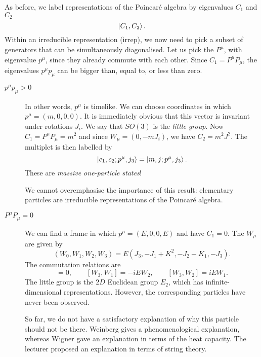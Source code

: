 As before, we label representations of the Poincaré algebra by eigenvalues $C_1$ and $C_2$
\begin{equation}
  \ket{C_1, C_2}.
\end{equation}
Within an irreducible representation (irrep), we now need to pick a subset of generators that can be simultaneously diagonalised. Let us pick the $P^{\mu}$, with eigenvalue $p^{\mu}$, since they already commute with each other.
Since $C_1 = P^{\mu} P_{\mu}$, the eigenvalues $p^{\mu} p_{\mu}$ can be bigger than, equal to, or less than zero.
\begin{description}
  \item[$p^{\mu} p_{\mu}> 0$] In other words, $p^{\mu}$ is timelike. We can choose coordinates in which $p^{\mu} = (m, 0,0,0)$.
    It is immediately obvious that this vector is invariant under rotations $J_i$. We say that $SO(3)$ is the \emph{little group}.
    Now $C_1 = P^{\mu} P_{\mu} = m^2$ and since $W_{\mu} = (0, -m J_i)$, we have $C_2 = m^2 J^2$.
    The multiplet is then labelled by
    \begin{equation}
      \ket{c_1, c_2; p^{\mu}, j_3} = \ket{m, j; p^{\mu}, j_3}.
    \end{equation}
    These are \emph{massive one-particle states}!
    \begin{remark}
      We cannot overemphasise the importance of this result: elementary particles are irreducible representations of the Poincaré algebra.
    \end{remark}
  \item[$P^{\mu} P_{\mu} = 0$] We can find a frame in which $p^{\mu} = (E, 0, 0, E)$ and have $C_1 = 0$.
    The $W_{\mu}$ are given by
    \begin{equation}
      (W_0, W_1, W_2, W_3) = E(J_3, -J_1 + K^2, -J_2 -K_1, -J_3).
    \end{equation}
    The commutation relations are
    \begin{equation}
      [W_1, W_2] = 0, \qquad [W_3, W_1] = -i E W_2, \qquad [W_3, W_2]= i E W_1.
    \end{equation}
    The little group is the $2D$ Euclidean group $E_2$, which has infinite-dimensional representations. However, the corresponding particles have never been observed.
    \begin{remark}
      So far, we do not have a satisfactory explanation of why this particle should not be there.
      Weinberg gives a phenomenological explanation, whereas Wigner gave an explanation in terms of the heat capacity. The lecturer proposed an explanation in terms of string theory.

\end{remark}
\end{description}
